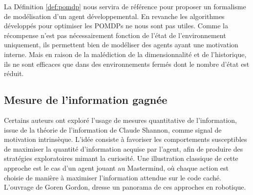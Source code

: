 
La Définition \ref{def:pomdp} nous servira de référence pour proposer un formalisme de modélisation d'un agent développemental. 
En revanche les algorithmes développés pour optimiser les POMDPs ne nous sont pas utiles. 
Comme la récompense n'est pas nécessairement fonction de l'état de l'environnement uniquement, ils permettent bien de modéliser des agents ayant une motivation interne. 
Mais en raison de la malédiction de la dimensionnalité et de l'historique, ils ne sont efficaces que dans des environnements fermés dont le nombre d'état est réduit.  





\subsection{Mesure de l'information gagnée}
\label{sec:information}

\noindent
Certains auteurs ont exploré l'usage de mesures quantitative de l'information, issue de la théorie de l'information de Claude Shannon, comme signal de motivation intrinsèque.
L’idée consiste à favoriser les comportements susceptibles de maximiser la quantité d’information acquise par l’agent, afin de produire des stratégies exploratoires mimant la curiosité.
Une illustration classique de cette approche est le cas d’un agent jouant au Mastermind, où chaque action est choisie de manière à maximiser l’information attendue sur le code caché.
L'ouvrage de Goren Gordon,   \cite{gordon_new_2018} dresse un panorama de ces approches en robotique.

